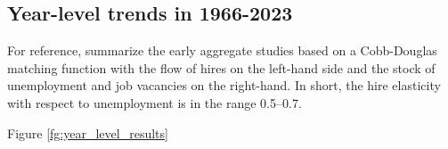 \documentclass[12pt]{article}
\begin{document}
\subsection{Year-level trends in 1966-2023}

For reference, \cite{petrongolo2001looking} summarize the early aggregate studies based on a Cobb-Douglas matching function with the flow of hires on the left-hand side and the stock of unemployment and job vacancies on the right-hand. 
In short, the hire elasticity with respect to unemployment is in the range 0.5–0.7.

Figure \ref{fg:year_level_results}

\begin{figure}[!ht]
  \begin{center}
  \\
\end{center}
\end{figure}
\end{document}
